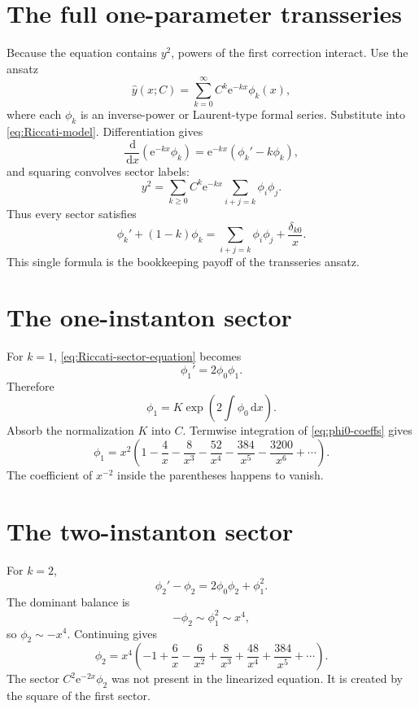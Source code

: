 \documentclass[11pt,openany]{book}
\theoremstyle{definition}
\theoremstyle{plain}
\theoremstyle{remark}
\newcommand{\dd}{\,\mathrm{d}}
\newcommand{\e}{\mathrm{e}}
\newcommand{\asym}{\sim}
\newcommand{\trans}[1]{\widehat{#1}}
\begin{document}
\section{The full one-parameter transseries}

Because the equation contains $y^2$, powers of the first correction interact. Use the ansatz
\begin{equation}\label{eq:Riccati-full-transseries}
 \trans y(x;C)=\sum_{k=0}^{\infty}C^k\e^{-kx}\phi_k(x),
\end{equation}
where each $\phi_k$ is an inverse-power or Laurent-type formal series. Substitute into \cref{eq:Riccati-model}. Differentiation gives
\[
 \frac{\dd}{\dd x}\left(\e^{-kx}\phi_k\right)
 =\e^{-kx}(\phi_k'-k\phi_k),
\]
and squaring convolves sector labels:
\[
 y^2=\sum_{k\ge0}C^k\e^{-kx}
 \sum_{i+j=k}\phi_i\phi_j.
\]
Thus every sector satisfies
\begin{equation}\label{eq:Riccati-sector-equation}
 \phi_k'+(1-k)\phi_k
 =\sum_{i+j=k}\phi_i\phi_j+\frac{\delta_{k0}}x.
\end{equation}
This single formula is the bookkeeping payoff of the transseries ansatz.

\section{The one-instanton sector}

For $k=1$, \cref{eq:Riccati-sector-equation} becomes
\[
 \phi_1'=2\phi_0\phi_1.
\]
Therefore
\[
 \phi_1=K\exp\left(2\int\phi_0\dd x\right).
\]
Absorb the normalization $K$ into $C$. Termwise integration of \cref{eq:phi0-coeffs} gives
\begin{equation}\label{eq:phi1}
 \phi_1=x^2\left(
 1-\frac4x-\frac8{x^3}-\frac{52}{x^4}
 -\frac{384}{x^5}-\frac{3200}{x^6}+\cdots
 \right).
\end{equation}
The coefficient of $x^{-2}$ inside the parentheses happens to vanish.

\section{The two-instanton sector}

For $k=2$,
\[
 \phi_2'-\phi_2=2\phi_0\phi_2+\phi_1^2.
\]
The dominant balance is
\[
 -\phi_2\asym\phi_1^2\asym x^4,
\]
so $\phi_2\asym-x^4$. Continuing gives
\begin{equation}\label{eq:phi2}
 \phi_2=x^4\left(
 -1+\frac6x-\frac6{x^2}+\frac8{x^3}
 +\frac{48}{x^4}+\frac{384}{x^5}+\cdots
 \right).
\end{equation}
The sector $C^2\e^{-2x}\phi_2$ was not present in the linearized equation. It is created by the square of the first sector.
\end{document}
